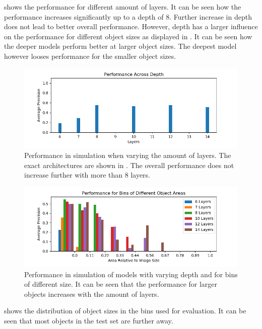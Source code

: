 	 shows the performance for different amount of layers. It can be seen how the performance increases significantly up to a depth of 8. Further increase in depth does not lead to better overall performance. However, depth has a larger influence on the performance for different object sizes as displayed in . It can be seen how the deeper models perform better at larger object sizes. The deepest model however looses performance for the smaller object sizes.

	\begin{figure}[hbtp]
		\centering
		\includegraphics[width=\textwidth]{fig/perf_depth}
		\caption{Performance in simulation when varying the amount of layers. The exact architectures are shown in . The overall performance does not increase further with more than 8 layers.}
		\label{fig:perf_depth}
	\end{figure}


	\begin{figure}[hbtp]
		\centering
		\includegraphics[width=\textwidth]{fig/depth_ap_size}
		\caption{Performance in simulation of models with varying depth and for bins of different size. It can be seen that the performance for larger objects increases with the amount of layers.}
		\label{fig:depth_ap_size}
	\end{figure}
	
	 shows the distribution of object sizes in the bins used for evaluation. It can be seen that most objects in the test set are further away. 
	

